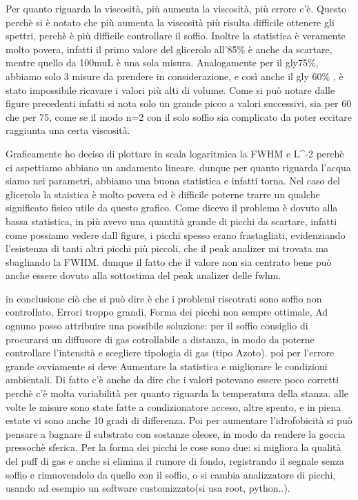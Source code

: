 Per quanto riguarda la viscosità, più aumenta la viscosità, più errore c'è. Questo perchè si è notato che più aumenta la viscosità più risulta difficile ottenere gli spettri, perchè è più difficile controllare il soffio. Inoltre la statistica è veramente molto povera, infatti il primo valore del glicerolo all'85\% è anche da scartare, mentre quello da 100muL è una sola misura. Analogamente per il gly75\%, abbiamo solo 3 misure da prendere in considerazione, e così anche il gly 60\% , è stato impossibile ricavare i valori più alti di volume. Come si può notare dalle figure precedenti infatti si nota solo un grande picco a valori successivi, sia per 60 che per 75, come se il modo n=2 con il solo soffio sia complicato da poter eccitare raggiunta una certa viscosità.

Graficamente ho deciso di plottare in scala logaritmica la FWHM e L^-2 perchè ci aspettiamo abbiano un andamento lineare. dunque per quanto riguarda l'acqua siamo nei parametri, abbiamo una buona statistica e infatti torna. Nel caso del glicerolo la staistica è molto povera ed è difficile poterne trarre un qualche significato fisico utile da questo grafico. Come dicevo il problema è dovuto alla bassa statistica, in più avevo una quantità grande di picchi da scartare, infatti come possiamo vedere dall figure, i picchi spesso erano frastagliati, evidenziando l'esistenza di tanti altri picchi più piccoli, che il peak analizer mi trovata ma sbagliando la FWHM. dunque il fatto che il valore non sia centrato bene può anche essere dovuto alla sottostima del peak analizer delle fwhm.

in conclusione ciò che si può dire è che i problemi riscotrati sono soffio non controllato, Errori troppo grandi, Forma dei picchi non sempre ottimale, Ad ognuno posso attribuire una possibile soluzione: per il soffio consiglio di procurarsi  un diffusore di gas cotrollabile a distanza, in modo da poterne controllare l'intensità e scegliere tipologia di gas (tipo Azoto). poi per l'errore grande ovviamente si deve Aumentare la statistica e migliorare le condizioni ambientali. Di fatto c'è anche da dire che i valori potevano essere poco corretti perchè c'è molta variabilità per quanto riguarda la temperatura della stanza. alle volte le misure sono state fatte a condizionatore acceso, altre spento, e in piena estate vi sono anche 10 gradi di differenza. Poi per aumentare l'idrofobicità si può pensare a bagnare il substrato con sostanze oleose, in modo da  rendere la goccia pressochè sferica. Per la forma dei picchi le cose sono due: si migliora la qualità del puff di gas e anche si elimina il rumore di fondo, registrando il segnale senza soffio e rimuovendolo da quello con il soffio, o si cambia analizzatore di picchi, usando ad esempio un software customizzato(si usa root, python..).
 








